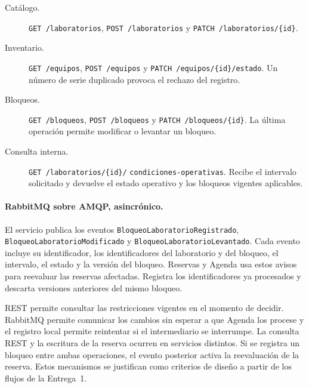 \begin{description}
    \item[Catálogo.] \texttt{GET /laboratorios},
    \texttt{POST /laboratorios} y \texttt{PATCH /laboratorios/\{id\}}.
    \item[Inventario.] \texttt{GET /equipos}, \texttt{POST /equipos} y
    \texttt{PATCH /equipos/\{id\}/estado}. Un número de serie duplicado
    provoca el rechazo del registro.
    \item[Bloqueos.] \texttt{GET /bloqueos}, \texttt{POST /bloqueos} y
    \texttt{PATCH /bloqueos/\{id\}}. La última operación permite
    modificar o levantar un bloqueo.
    \item[Consulta interna.] \texttt{GET /laboratorios/\{id\}/}\allowbreak
    \texttt{condiciones-operativas}. Recibe el intervalo solicitado y
    devuelve el estado operativo y los bloqueos vigentes aplicables.
\end{description}

\paragraph{RabbitMQ sobre AMQP, asincrónico.}
El servicio publica los eventos \texttt{BloqueoLaboratorioRegistrado},
\texttt{BloqueoLaboratorioModificado} y
\texttt{BloqueoLaboratorioLevantado}. Cada evento incluye su identificador,
los identificadores del laboratorio y del bloqueo, el intervalo, el estado
y la versión del bloqueo. Reservas y Agenda usa estos avisos para reevaluar
las reservas afectadas. Registra los identificadores ya procesados y
descarta versiones anteriores del mismo bloqueo.

REST permite consultar las restricciones vigentes en el momento de decidir.
RabbitMQ permite comunicar los cambios sin esperar a que Agenda los procese
y el registro local permite reintentar si el intermediario se interrumpe.
La consulta REST y la escritura de la reserva ocurren en servicios
distintos. Si se registra un bloqueo entre ambas operaciones, el evento
posterior activa la reevaluación de la reserva. Estos mecanismos se
justifican como criterios de diseño a partir de los flujos de la Entrega~1.
